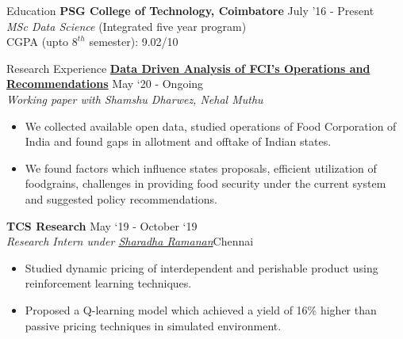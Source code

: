 \documentclass{resume} %
\begin{document}
\begin{rSection}{Education}
\vspace*{0.1in}
{\bf PSG College of Technology, Coimbatore} \hfill {July '16 - Present} \\ {\emph{MSc Data Science} (Integrated  five year program)} \\
CGPA (upto $8^{th}$ semester): 9.02/10
\end{rSection}
\begin{rSection}{Research Experience}
\vspace*{0.1in}
{\bf \href{https://arunpalaniappan.github.io/files/FCI.pdf}{Data Driven Analysis of FCI’s Operations and Recommendations}} { \hfill May `20 - Ongoing}\\
\textit{Working paper with Shamshu Dharwez, Nehal Muthu}
\begin{itemize}
\item We collected available open data, studied operations of Food Corporation of India and found gaps in allotment and offtake of Indian states.
\item We found factors which influence states proposals, efficient utilization of foodgrains, challenges in providing food security under the current system and suggested policy recommendations.
\end{itemize}

{\bf TCS Research} { \hfill May `19 - October `19}\\
\textit{Research Intern under \href{https://www.linkedin.com/in/sharadha-ramanan-43bb4946/}{Sharadha Ramanan}}{\hfill Chennai}
\begin{itemize}
\item Studied dynamic pricing of interdependent and perishable product using reinforcement learning techniques.
\item Proposed a Q-learning model which achieved a yield of 16\% higher than passive pricing techniques in simulated environment.
\end{itemize}
\end{rSection}
\end{document}
